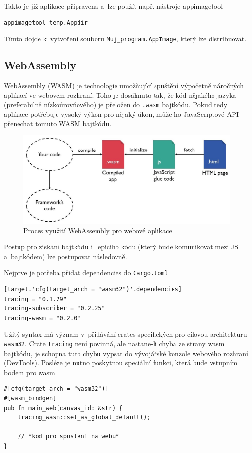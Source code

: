 \documentclass[a4paper, 12pt, twoside]{article} %
\begin{document}
		Takto je již aplikace připravená a~lze použít např. nástroje appimagetool\cite{appimagetool}
		\begin{verbatim}
appimagetool temp.Appdir
		\end{verbatim}

		Tímto dojde k~vytvoření souboru \texttt{Muj\_program.AppImage}, který lze distribuovat.

	\subsection{WebAssembly}
		WebAssembly (WASM) je technologie umožňující spuštění výpočetně náročných aplikací ve webovém rozhraní. Toho je dosáhnuto tak, že kód nějakého jazyka (preferabilně nízkoúrovňového) je přeložen do \texttt{.wasm} bajtkódu. Pokud tedy aplikace potřebuje vysoký výkon pro nějaký úkon, může ho JavaScriptové API přenechat tomuto WASM bajtkódu.\cite{wasm}
		
		\begin{center}
			\begin{figure}[H]
				\centering
				\includegraphics[width=13cm]{wasm}
				\caption{Proces využití WebAssembly pro webové aplikace \cite{wasm_fig}}
				\label{fig:wasm}
			\end{figure}
		\end{center}
		
		Postup pro získání bajtkódu i~lepícího kódu (který bude komunikovat mezi JS a~bajtkódem) lze postupovat následovně.
		
		Nejprve je potřeba přidat dependencies do \texttt{Cargo.toml}
		\begin{verbatim}
[target.'cfg(target_arch = "wasm32")'.dependencies]
tracing = "0.1.29"
tracing-subscriber = "0.2.25"
tracing-wasm = "0.2.0"
		\end{verbatim}
		
		Užitý syntax má význam v~přidávání crates specifických pro cílovou architekturu \texttt{wasm32}. Crate \texttt{tracing} není povinná, ale nastane-li chyba ze strany wasm bajtkódu, je schopna tuto chybu vypsat do vývojářské konzole webového rozhraní (DevTools). Posléze je nutno poskytnou speciální funkci, která bude vstupním bodem pro wasm
		\begin{verbatim}
#[cfg(target_arch = "wasm32")]
#[wasm_bindgen]
pub fn main_web(canvas_id: &str) {
	tracing_wasm::set_as_global_default();

	// *kód pro spuštění na webu*
}
		\end{verbatim}
		
\end{document}
